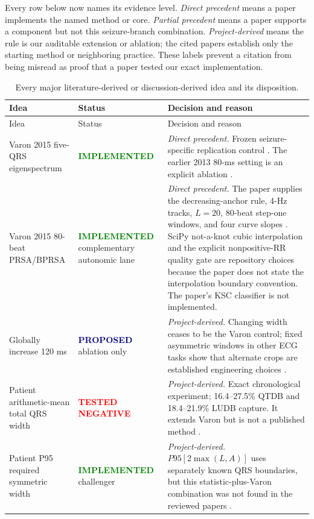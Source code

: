 \documentclass[11pt,a4paper]{article}
\newcommand{\implemented}{\textcolor{green}{\textbf{IMPLEMENTED}}}
\newcommand{\testednegative}{\textcolor{red}{\textbf{TESTED NEGATIVE}}}
\newcommand{\proposed}{\textcolor{navy}{\textbf{PROPOSED}}}
\begin{document}
Every row below now names its evidence level. \emph{Direct precedent} means a
paper implements the named method or core. \emph{Partial precedent} means a
paper supports a component but not this seizure-branch combination.
\emph{Project-derived} means the rule is our auditable extension or ablation;
the cited papers establish only the starting method or neighboring practice.
These labels prevent a citation from being misread as proof that a paper tested
our exact implementation.

\begin{longtable}{p{}>{\small}p{}p{}}
\caption{Every major literature-derived or discussion-derived idea and its disposition.}\\
\toprule
Idea & Status & Decision and reason \\
\midrule
\endfirsthead
\toprule
Idea & Status & Decision and reason \\
\midrule
\endhead
Varon 2015 five-QRS eigenspectrum & \implemented & \emph{Direct precedent.} Frozen seizure-specific replication control \cite{varon2015}. The earlier 2013 80-ms setting is an explicit ablation \cite{varon2013}. \\
Varon 2015 80-beat PRSA/BPRSA & \implemented{} complementary autonomic lane & \emph{Direct precedent.} The paper supplies the decreasing-anchor rule, 4-Hz tracks, $L=20$, 80-beat step-one windows, and four curve slopes \cite{varon2015}. SciPy not-a-knot cubic interpolation and the explicit nonpositive-RR quality gate are repository choices because the paper does not state the interpolation boundary convention. The paper's KSC classifier is not implemented. \\
Globally increase 120 ms & \proposed{} ablation only & \emph{Project-derived.} Changing width ceases to be the Varon control; fixed asymmetric windows in other ECG tasks show that alternate crops are established engineering choices \cite{varon2015,singh2013}. \\
Patient arithmetic-mean total QRS width & \testednegative & \emph{Project-derived.} Exact chronological experiment; 16.4--27.5\% QTDB and 18.4--21.9\% LUDB capture. It extends Varon but is not a published method \cite{varon2015,martinez2004}. \\
Patient P95 required symmetric width & \implemented{} challenger & \emph{Project-derived.} $P95[2\max(L,A)]$ uses separately known QRS boundaries, but this statistic-plus-Varon combination was not found in the reviewed papers \cite{martinez2004,illanes2007}. \\

\end{longtable}
\end{document}
